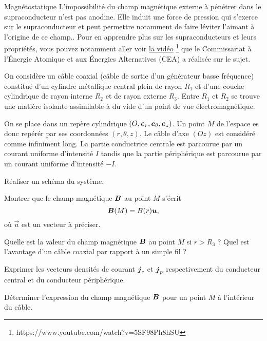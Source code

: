 \begin{td}{Magnétostatique}
L'impossibilité du champ magnétique externe à pénétrer dans le supraconducteur n'est pas anodine.
Elle induit une force de pression qui s'exerce sur le supraconducteur et peut permettre notamment de faire léviter l'aimant à l'origine de ce champ.. 
Pour en apprendre plus sur les supraconducteurs et leurs propriétés, 
vous pouvez notamment aller voir 
\href{https://www.youtube.com/watch?v=5SF98Ph8hSU}{la vidéo}
\footnote{https://www.youtube.com/watch?v=5SF98Ph8hSU} que 
le Commissariat à l'Énergie Atomique et aux Énergies Alternatives (CEA) a réalisée 
sur le sujet.


	On considère un câble coaxial (câble de sortie d'un générateur basse fréquence)
	constitué d'un cylindre métallique central plein de rayon $R_1$ et d'une 
	couche cylindrique de rayon interne $R_2$ et de rayon externe $R_3$. 
	Entre $R_1$ et $R_2$ se trouve une matière isolante assimilable à du vide d'un 
	point de vue électromagnétique. 
	
	On se place dans un repère cylindrique 
	$(O, \er, \etheta, \ez)$. Un point $M$ de l'espace es donc repérér par 
	ses coordonnées $(r, \theta, z)$. Le câble d'axe $(Oz)$ est considéré
	comme infiniment long. La partie conductrice centrale est parcourue 
	par un courant uniforme d'intensité $I$ tandis que la partie périphérique
	est parcourue par un courant uniforme d'intensité $-I$.

	\begin{exlist}
		\item Réaliser un schéma du système.
		\item Montrer que le champ magnétique $\vecb$ au point $M$ s'écrit
		\begin{equation*}
			\vecb(M) = B(r) \vec{u},
		\end{equation*}
		où $\vec{u}$ est un vecteur à préciser.
		\item Quelle est la valeur du champ magnétique $\vecb$ au point $M$
		  si $r > R_3$ ? Quel est l'avantage d'un câble coaxial par rapport
		  à un simple fil ?
		\item Exprimer les vecteurs densités de courant $\vecj_c$ et 
		  $\vecj_p$ respectivement du conducteur central et du conducteur 
		  périphérique.
		\item Déterminer l'expression du champ magnétique $\vecb$ pour
		  un point $M$ à l'intérieur du câble.
	\end{exlist}
\end{td}

